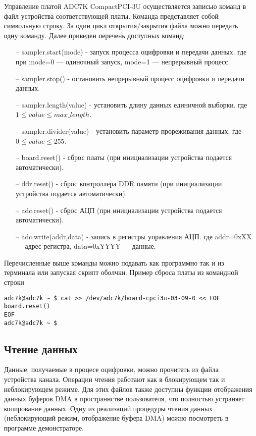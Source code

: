 \documentclass[a4paper]{article}
\begin{document}
Управление платой ADC7K \mbox{CompactPCI-3U} осуществляется записью команд в
файл устройства соответствующей платы. Команда представляет собой символьную строку.
За один цикл открытия/закрытия файла можно передать одну команду.
Далее приведен перечень доступных команд:
\begin{itemize}
\item[--] sampler.start(mode) - запуск процесса оцифровки и передачи данных.
где при mode=0 --- одиночный запуск, mode=1 --- непрерывный процесс.
\item[--] sampler.stop() - остановить непрерывный процесс оцифровки и передачи данных.
\item[--] sampler.length(value) - установить длину данных единичной выборки. где \(1 \leq value \leq max\_length\).
\item[--] sampler.divider(value) - установить параметр прореживания данных. где \(0 \leq value \leq 255\).
\item[--] board.reset() - сброс платы (при инициализации устройства подается автоматически).
\item[--] ddr.reset() - сброс контроллера DDR памяти (при инициализации устройства подается автоматически).
\item[--] adc.reset() - сброс АЦП (при инициализации устройства подается автоматически).
\item[--] adc.write(addr,data) - запись в регистры управления АЦП. где addr=0xXX --- адрес регистра, data=0xYYYY --- данные.
\end{itemize}

Перечисленные выше команды можно подавать как программно так и из терминала или запуская скрипт оболчки.
Пример сброса платы из командной строки
\begin{small}\begin{verbatim}
adc7k@adc7k ~ $ cat >> /dev/adc7k/board-cpci3u-03-09-0 << EOF
board.reset()
EOF
adc7k@adc7k ~ $
\end{verbatim}\end{small}

\subsection{Чтение данных}

Данные, получаемые в процесе оцифровки, можно прочитать из файла устройства канала.
Операции чтения работают как в блокирующем так и неблокирующем режиме.
Для этих файлов также доступны функции отображения данных буферов DMA в пространнстве
пользователя, что полностью устраняет копирование данных.
Одну из реализаций процедуры чтения данных (неблокирующий режим, отображение буфера DMA)
можно посмотреть в программе демонстраторе.
\end{document}
